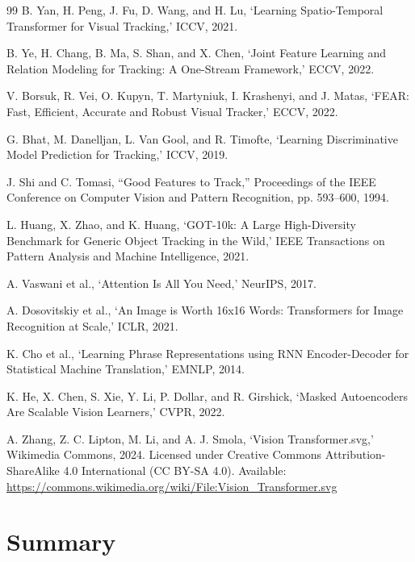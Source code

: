 \documentclass[bachelorthesis]{fer}
\numberwithin{equation}{chapter}
\begin{document}
\begin{thebibliography}{99}
         B. Yan, H. Peng, J. Fu, D. Wang, and H. Lu, `Learning Spatio-Temporal Transformer
        for Visual Tracking,' ICCV, 2021.

         B. Ye, H. Chang, B. Ma, S. Shan, and X. Chen, `Joint Feature Learning and
        Relation Modeling for Tracking: A One-Stream Framework,' ECCV, 2022.

         V. Borsuk, R. Vei, O. Kupyn, T. Martyniuk, I. Krashenyi, and J. Matas, `FEAR:
        Fast, Efficient, Accurate and Robust Visual Tracker,' ECCV, 2022.

         G. Bhat, M. Danelljan, L. Van Gool, and R. Timofte, `Learning Discriminative
        Model Prediction for Tracking,' ICCV, 2019.

         J. Shi and C. Tomasi, ``Good Features to Track,'' Proceedings of the IEEE Conference on Computer Vision and Pattern Recognition, pp. 593--600, 1994.

         L. Huang, X. Zhao, and K. Huang, `GOT-10k: A Large High-Diversity Benchmark for
        Generic Object Tracking in the Wild,' IEEE Transactions on Pattern Analysis and Machine
        Intelligence, 2021.

         A. Vaswani et al., `Attention Is All You Need,' NeurIPS, 2017.

         A. Dosovitskiy et al., `An Image is Worth 16x16 Words: Transformers for Image
        Recognition at Scale,' ICLR, 2021.

         K. Cho et al., `Learning Phrase Representations using RNN Encoder-Decoder for
        Statistical Machine Translation,' EMNLP, 2014.

         K. He, X. Chen, S. Xie, Y. Li, P. Dollar, and R. Girshick, `Masked Autoencoders
        Are Scalable Vision Learners,' CVPR, 2022.

         A. Zhang, Z. C. Lipton, M. Li, and A. J. Smola, `Vision Transformer.svg,'
        Wikimedia Commons, 2024. Licensed under Creative Commons Attribution-ShareAlike 4.0
        International (CC BY-SA 4.0). Available:
        \url{https://commons.wikimedia.org/wiki/File:Vision_Transformer.svg}

    \end{thebibliography}

    \chapter*{Summary}
\end{document}
